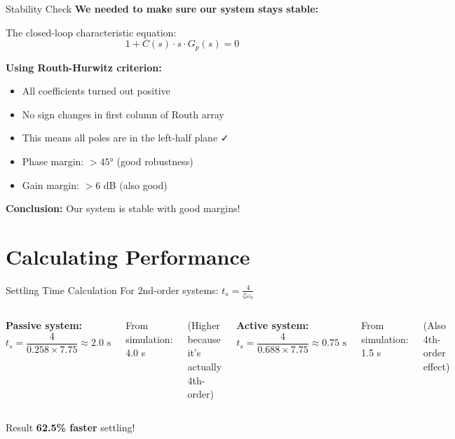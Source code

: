 \documentclass[aspectratio=169]{beamer}
\begin{document}
\begin{frame}{Stability Check}
  \textbf{We needed to make sure our system stays stable:}
  
  The closed-loop characteristic equation:
  \begin{equation}
    1 + C(s) \cdot s \cdot G_p(s) = 0
  \end{equation}
  
  \vspace{0.3cm}
  
  \textbf{Using Routh-Hurwitz criterion:}
  \begin{itemize}
    \item All coefficients turned out positive
    \item No sign changes in first column of Routh array
    \item This means all poles are in the left-half plane ✓
    \item Phase margin: $> 45°$ (good robustness)
    \item Gain margin: $> 6$ dB (also good)
  \end{itemize}
  
  \vspace{0.3cm}
  
  \textbf{Conclusion:} Our system is stable with good margins!
\end{frame}

\section{Calculating Performance}

\begin{frame}{Settling Time Calculation}
  For 2nd-order systems: $t_s = \frac{4}{\zeta \omega_n}$
  
  \vspace{0.3cm}
  
  \begin{columns}
    \textbf{Passive system:}
    \begin{equation}
      t_s = \frac{4}{0.258 \times 7.75} \approx 2.0 \text{ s}
    \end{equation}
    
    From simulation: 4.0 s
    
    (Higher because it's actually 4th-order)
    
    \textbf{Active system:}
    \begin{equation}
      t_s = \frac{4}{0.688 \times 7.75} \approx 0.75 \text{ s}
    \end{equation}
    
    From simulation: 1.5 s
    
    (Also 4th-order effect)
  \end{columns}
  
  \vspace{0.5cm}
  
  \begin{alertblock}{Result}
    \Large \textbf{62.5\% faster} settling!
  \end{alertblock}
\end{frame}
\end{document}
